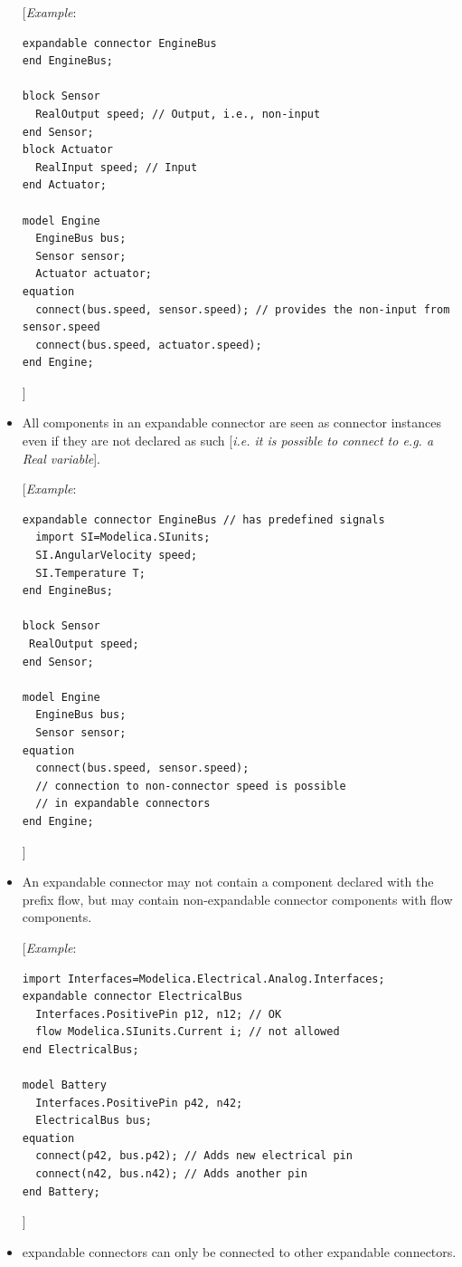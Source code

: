 \documentclass[10pt,a4paper]{report}
\begin{document}
\begin{itemize}
{[}\emph{Example}:
\begin{lstlisting}[language=modelica]
expandable connector EngineBus
end EngineBus;

block Sensor
  RealOutput speed; // Output, i.e., non-input
end Sensor;
block Actuator
  RealInput speed; // Input
end Actuator;

model Engine
  EngineBus bus;
  Sensor sensor;
  Actuator actuator;
equation
  connect(bus.speed, sensor.speed); // provides the non-input from sensor.speed
  connect(bus.speed, actuator.speed);
end Engine;
\end{lstlisting}
{]}

\item
  All components in an expandable connector are seen as connector
  instances even if they are not declared as such {[}\emph{i.e. it is
  possible to connect to e.g. a Real variable}{]}.

{[}\emph{Example}:
\begin{lstlisting}[language=modelica]
expandable connector EngineBus // has predefined signals
  import SI=Modelica.SIunits;
  SI.AngularVelocity speed;
  SI.Temperature T;
end EngineBus;

block Sensor
 RealOutput speed;
end Sensor;

model Engine
  EngineBus bus;
  Sensor sensor;
equation
  connect(bus.speed, sensor.speed);
  // connection to non-connector speed is possible
  // in expandable connectors
end Engine;
\end{lstlisting}
{]}

\item
  An expandable connector may not contain a component declared with the
  prefix flow, but may contain non-expandable connector components with
  flow components.

{[}\emph{Example}:
\begin{lstlisting}[language=modelica]
import Interfaces=Modelica.Electrical.Analog.Interfaces;
expandable connector ElectricalBus
  Interfaces.PositivePin p12, n12; // OK
  flow Modelica.SIunits.Current i; // not allowed
end ElectricalBus;

model Battery
  Interfaces.PositivePin p42, n42;
  ElectricalBus bus;
equation
  connect(p42, bus.p42); // Adds new electrical pin
  connect(n42, bus.n42); // Adds another pin
end Battery;
\end{lstlisting}

{]}

\item
  expandable connectors can only be connected to other expandable
  connectors.


\end{itemize}
\end{document}
